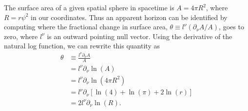 \documentclass[12pt]{article}
\numberwithin{equation}{section}
\begin{document}
The surface area of a given spatial sphere in spacetime is $A = 4 \pi R^2$, where $R = r \psi^2$ in our coordinates.  Thus an apparent horizon can be identified by computing where the fractional change in surface area, $\theta \equiv l^\nu (\partial_\nu A / A)$, goes to zero, where $l^\nu$ is an outward pointing null vector.  Using the derivative of the natural log function, we can rewrite this quantity as
\begin{equation} \label{eq:apparent_horiz_defn}
\begin{aligned}
\theta &\equiv \frac{l^\nu \partial_\nu A}{A} \\
&= l^\nu \partial_\nu \ln(A) \\
&= l^\nu \partial_\nu \ln(4 \pi R^2) \\
&= l^\nu \partial_\nu [\ln(4) + \ln(\pi) + 2 \ln(r)] \\
&= 2 l^\nu \partial_\nu \ln(R).
\end{aligned}
\end{equation}
\end{document}

